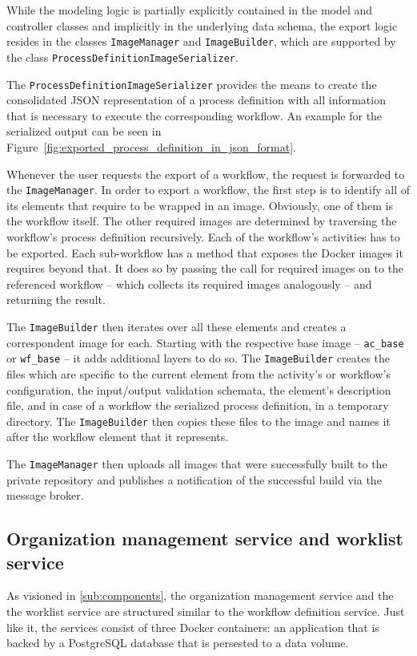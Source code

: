     While the modeling logic is partially explicitly contained in the model and controller classes and implicitly in the underlying data schema, the export logic resides in the classes \texttt{ImageManager} and \texttt{ImageBuilder}, which are supported by the class \texttt{ProcessDefinitionImageSerializer}.

    The \texttt{ProcessDefinitionImageSerializer} provides the means to create the consolidated JSON representation of a process definition with all information that is necessary to execute the corresponding workflow. An example for the serialized output can be seen in Figure~\ref{fig:exported_process_definition_in_json_format}.

    Whenever the user requests the export of a workflow, the request is forwarded to the \texttt{ImageManager}.
    In order to export a workflow, the first step is to identify all of its elements that require to be wrapped in an image. Obviously, one of them is the workflow itself. The other required images are determined by traversing the workflow's process definition recursively. Each of the workflow's activities has to be exported. Each sub-workflow has a method that exposes the Docker images it requires beyond that. It does so by passing the call for required images on to the referenced workflow -- which collects its required images analogously -- and returning the result.

    The \texttt{ImageBuilder} then iterates over all these elements and creates a correspondent image for each. Starting with the respective base image -- \texttt{ac\_base} or \texttt{wf\_base} -- it adds additional layers to do so. The \texttt{ImageBuilder} creates the files which are specific to the current element from the activity's or workflow's configuration, \ie the input/output validation schemata, the element's description file, and in case of a workflow the serialized process definition, in a temporary directory. The \texttt{ImageBuilder} then copies these files to the image and names it after the workflow element that it represents.

    The \texttt{ImageManager} then uploads all images that were successfully built to the private repository and publishes a notification of the successful build via the message broker.

  \subsection{Organization management service and worklist service} %
    \label{sub:organization_management_service}
      As visioned in \ref{sub:components}, the organization management service and the the worklist service are structured similar to the workflow definition service. Just like it, the services consist of three Docker containers: an application that is backed by a PostgreSQL database that is persested to a data volume.

